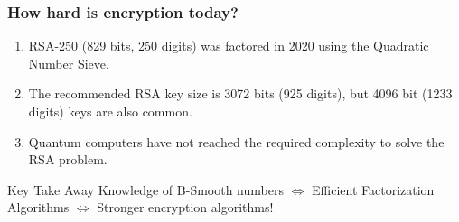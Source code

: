 \documentclass[11pt,xcolor={dvipsnames}]{beamer}
\begin{document}
	\begin{frame}
		\frametitle{How hard is encryption today?}
		\begin{enumerate}
			\item RSA-250 (829 bits, 250 digits) was factored in 2020 using the Quadratic Number Sieve.
			\item The recommended RSA key size is 3072 bits (925 digits), but 4096 bit (1233 digits) keys are also common.
			\item Quantum computers have not reached the required complexity to solve the RSA problem.
		\end{enumerate}
	\begin{alertblock}{Key Take Away}
		 Knowledge of B-Smooth numbers $\iff$ Efficient Factorization Algorithms $\iff$ Stronger encryption algorithms! 
	\end{alertblock}
	\end{frame}
\end{document}
